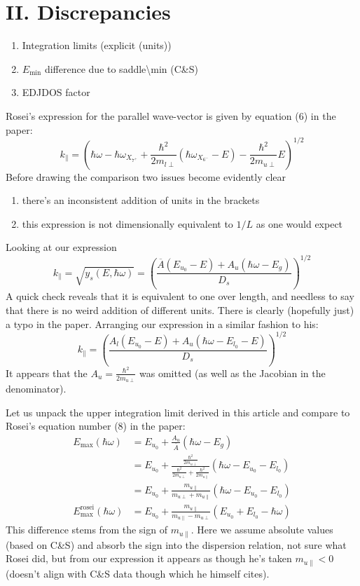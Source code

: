 \documentclass[11pt]{article}
\newcommand{\hw}{\hbar\omega}
\begin{document}
\section*{II. Discrepancies}
\begin{enumerate}
  \item Integration limits (explicit (units))
  \item $E_{\text{min}}$ difference due to saddle\textbackslash min (C\&S)
  \item EDJDOS factor
\end{enumerate}

\begin{warnbox}
Rosei's expression for the parallel wave-vector is given by equation (6) in the paper:
$$k_{\parallel} = \left(\hw - \hbar\omega_{X_{7^{+}}} + \frac{\hbar^{2}}{2m_{l\perp}}(\hbar\omega_{X_{6^{-}}} - E) - \frac{\hbar^{2}}{2m_{u\perp}}E\right)^{1/2}$$
Before drawing the comparison two issues become evidently clear
\begin{enumerate}
  \item there's an inconsistent addition of units in the brackets
  \item this expression is not dimensionally equivalent to $1/L$ as one would expect
\end{enumerate}
Looking at our expression
$$k_{\parallel} = \sqrt{y_{s}(E,\hw)} = \left(\frac{\overline{A}(E_{u_{0}}-E)+A_{u}(\hw-E_{g})}{D_{s}}\right)^{1/2}$$
A quick check reveals that it is equivalent to one over length, and needless to say that there is no weird addition of different units. There is clearly (hopefully just) a typo in the paper. Arranging our expression in a similar fashion to his:
$$k_{\parallel} = \left(\frac{A_{l}(E_{u_{0}}-E) + A_{u}(\hw - E_{l_{0}}-E)}{D_{s}}\right)^{1/2}$$
It appears that the $A_{u} = \frac{\hbar^{2}}{2m_{u\perp}}$ was omitted (as well as the Jacobian in the denominator).
\end{warnbox}

\begin{warnbox}
Let us unpack the upper integration limit derived in this article and compare to Rosei's equation number (8) in the paper:
\begin{align*}
E_{\text{max}}(\hw) &= E_{u_{0}} + \frac{A_{u}}{\overline{A}}(\hw-E_{g}) \\
&= E_{u_{0}} + \frac{\frac{\hbar^{2}}{2m_{u\perp}}}{\frac{\hbar^{2}}{2m_{u\perp}} + \frac{\hbar^{2}}{2m_{u\parallel}}}(\hw-E_{u_{0}}-E_{l_{0}}) \\
&= E_{u_{0}} + \frac{m_{u\parallel}}{m_{u\perp} + m_{u\parallel}}(\hw-E_{u_{0}}-E_{l_{0}}) \\[6pt]
E^{\text{rosei}}_{\text{max}}(\hw) &= E_{u_{0}} + \frac{m_{u\parallel}}{m_{u\parallel} - m_{u\perp}}(E_{u_{0}}+E_{l_{0}}-\hw)
\end{align*}
This difference stems from the sign of $m_{u\parallel}$. Here we assume absolute values (based on C\&S) and absorb the sign into the dispersion relation, not sure what Rosei did, but from our expression it appears as though he's taken $m_{u\parallel}<0$ (doesn't align with C\&S data though which he himself cites).
\end{warnbox}
\end{document}
